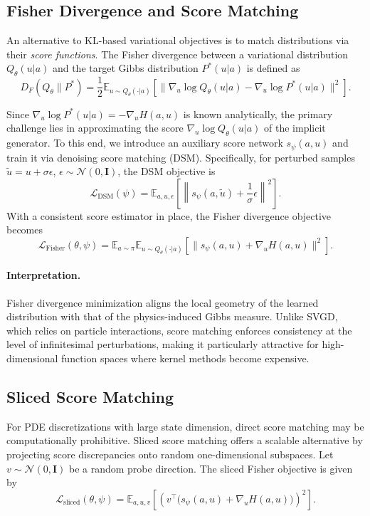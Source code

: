 \documentclass[11pt]{article}
\newcommand{\calN}{\mathcal{N}}
\newcommand{\calL}{\mathcal{L}}
\newcommand{\bbE}{\mathbb{E}}
\begin{document}
\subsection{Fisher Divergence and Score Matching}

An alternative to KL-based variational objectives is to match distributions via their \emph{score functions}. The Fisher divergence between a variational distribution $Q_\theta(u|a)$ and the target Gibbs distribution $P^*(u|a)$ is defined as
\begin{equation}
    D_F(Q_\theta \| P^*)
    =
    \frac{1}{2}
    \bbE_{u \sim Q_\theta(\cdot|a)}
    \left[
        \|\nabla_u \log Q_\theta(u|a) - \nabla_u \log P^*(u|a)\|^2
    \right].
\end{equation}

Since $\nabla_u \log P^*(u|a) = -\nabla_u H(a,u)$ is known analytically, the primary challenge lies in approximating the score $\nabla_u \log Q_\theta(u|a)$ of the implicit generator. To this end, we introduce an auxiliary score network $s_\psi(a,u)$ and train it via denoising score matching (DSM). Specifically, for perturbed samples $\tilde u = u + \sigma \epsilon$, $\epsilon \sim \calN(0,\mathbf{I})$, the DSM objective is
\begin{equation}
\calL_{\text{DSM}}(\psi)=\bbE_{a,u,\epsilon}
    \left[\left\|s_\psi(a,\tilde u) + \frac{1}{\sigma}\epsilon\right\|^2\right].
\end{equation}
With a consistent score estimator in place, the Fisher divergence objective becomes
\begin{equation}
    \calL_{\text{Fisher}}(\theta,\psi)
    =
    \bbE_{a \sim \pi}\bbE_{u \sim Q_\theta(\cdot|a)}
    \left[
        \|s_\psi(a,u) + \nabla_u H(a,u)\|^2
    \right].
\end{equation}

\paragraph{Interpretation.}
Fisher divergence minimization aligns the local geometry of the learned distribution with that of the physics-induced Gibbs measure. Unlike SVGD, which relies on particle interactions, score matching enforces consistency at the level of infinitesimal perturbations, making it particularly attractive for high-dimensional function spaces where kernel methods become expensive.

\subsection{Sliced Score Matching}
For PDE discretizations with large state dimension, direct score matching may be computationally prohibitive. Sliced score matching offers a scalable alternative by projecting score discrepancies onto random one-dimensional subspaces. Let $v \sim \calN(0,\mathbf{I})$ be a random probe direction. The sliced Fisher objective is given by
\begin{equation}
    \calL_{\text{sliced}}(\theta,\psi)
    =
    \bbE_{a,u,v}
    \left[
        \left(
            v^\top \big( s_\psi(a,u) + \nabla_u H(a,u) \big)
        \right)^2
    \right].
\end{equation}
\end{document}
